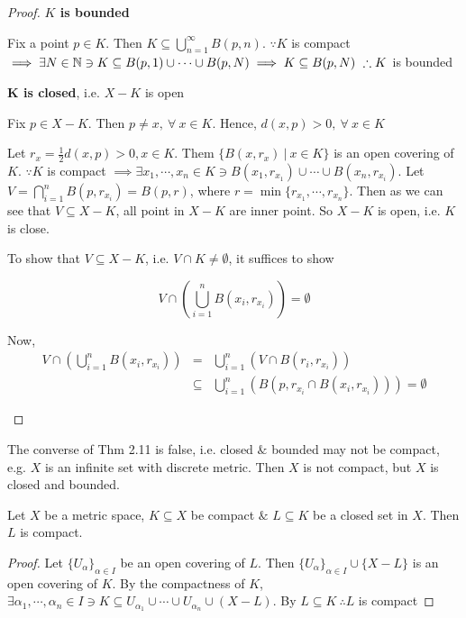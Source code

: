 \begin{proof}
	\textbf{$K$ is bounded}
	
	Fix a point $p \in K$. Then $K \subseteq \bigcup^{\infty}_{n=1}B(p,n)$. $\because K$ is compact $\implies \exists N \in \mathbb{N} \ni K \subseteq B(p,1) \cup \cdots \cup B(p,N) \implies K \subseteq B(p,N) ~\therefore K$ is bounded
	
	\textbf{K is closed}, i.e. $X - K$ is open
	
	Fix $p \in X - K$. Then $p \neq x,~\forall~ x \in K$. Hence, $d(x,p) > 0,~\forall~x \in K$
	
	Let $r_x = \frac{1}{2}d(x,p) > 0,x\in K$. Them $\{B(x,r_x)~|~x \in K\}$ is an open covering of $K$. $\because K$ is compact $\implies \exists x_1,\cdots,x_n \in K \ni B(x_1,r_{x_1}) \cup \cdots \cup B(x_n,r_{x_i})$. Let $V = \bigcap_{i=1}^{n}B(p,r_{x_i}) = B(p,r)$, where $r = \min \{r_{x_1},\cdots,r_{x_n}\}$. Then as we can see that $V \subseteq X - K$, all point in $X - K$ are inner point. So $X - K$ is open, i.e. $K$ is close. 
	
	\begin{tcolorbox}
		To show that $V \subseteq X - K$, i.e. $V \cap K \neq \emptyset$, it suffices to show
		
		$$V \cap (\bigcup^n_{i=1}B(x_i,r_{x_i})) = \emptyset$$
		
		Now, \begin{eqnarray*}
			V \cap (\bigcup^n_{i=1}B(x_i,r_{x_i})) &=& \bigcup^n_{i=1}(V \cap B(r_i,r_{x_i})) \\
			&\subseteq &  \bigcup^n_{i=1}(B(p,r_{x_i} \cap B(x_i,r_{x_i}))) = \emptyset
		\end{eqnarray*}
	\end{tcolorbox}
\end{proof}

\begin{rmk*}
	The converse of Thm 2.11 is false, i.e. closed $\&$ bounded may not be compact, e.g. $X$ is an infinite set with discrete metric. Then $X$ is not compact, but $X$ is closed and bounded.
\end{rmk*}

\begin{thm}
	Let $X$ be a metric space, $K \subseteq X$ be compact $\&$ $L \subseteq K$ be a closed set in $X$. Then $L$ is compact.
\end{thm}

\begin{proof}
	Let $\{U_{\alpha}\}_{\alpha \in I}$ be an open covering of $L$. Then $\{U_{\alpha}\}_{\alpha \in I} \cup \{X - L\}$ is an open covering of $K$. By the compactness of $K$, $\exists \alpha_1,\cdots,\alpha_n \in I \ni K \subseteq U_{\alpha_1} \cup \cdots \cup U_{\alpha_n} \cup (X-L)$. By $L \subseteq K~ \therefore L$ is compact
\end{proof}

